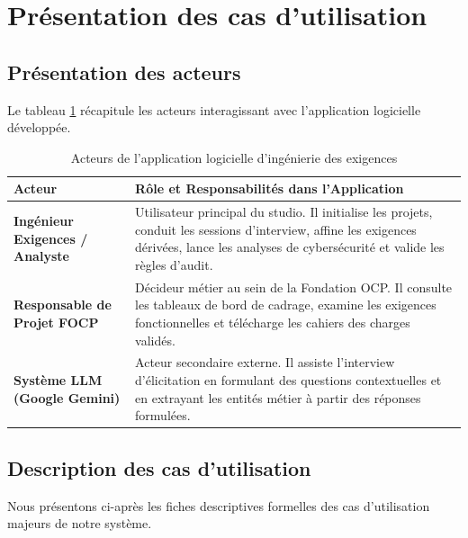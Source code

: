 \section{Présentation des cas d'utilisation}

\subsection{Présentation des acteurs}

Le tableau \ref{tab:acteurs} récapitule les acteurs interagissant avec l'application logicielle développée.

\begin{table}[H]
\centering
\caption{Acteurs de l'application logicielle d'ingénierie des exigences}
\label{tab:acteurs}
\begin{tabularx}{\textwidth}{|l|X|}
\hline
\rowcolor{focpgreen!18}
\textbf{Acteur} & \textbf{Rôle et Responsabilités dans l'Application} \\
\hline
\textbf{Ingénieur Exigences / Analyste} & Utilisateur principal du studio. Il initialise les projets, conduit les sessions d'interview, affine les exigences dérivées, lance les analyses de cybersécurité et valide les règles d'audit. \\
\hline
\textbf{Responsable de Projet FOCP} & Décideur métier au sein de la Fondation OCP. Il consulte les tableaux de bord de cadrage, examine les exigences fonctionnelles et télécharge les cahiers des charges validés. \\
\hline
\textbf{Système LLM (Google Gemini)} & Acteur secondaire externe. Il assiste l'interview d'élicitation en formulant des questions contextuelles et en extrayant les entités métier à partir des réponses formulées. \\
\hline
\end{tabularx}
\end{table}

\subsection{Description des cas d'utilisation}

Nous présentons ci-après les fiches descriptives formelles des cas d'utilisation majeurs de notre système.

